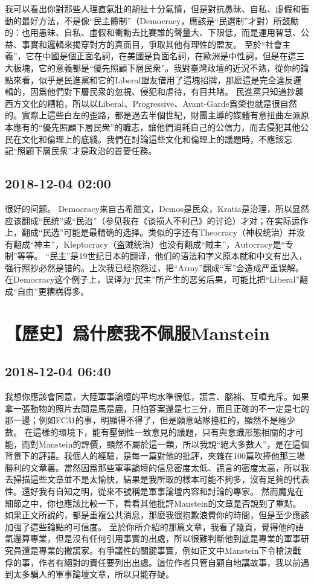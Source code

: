 \documentclass[twocolumn]{ctexart}
\begin{document}
我可以看出你對那些人理直氣壯的胡扯十分氣憤，但是對抗愚昧、自私、虛假和衝動的最好方法，不是像“民主體制”（Democracy，應該是“民選制”才對）所鼓勵的：也用愚昧、自私、虛假和衝動去比賽誰的聲量大、下限低，而是運用智慧、公益、事實和邏輯來揭穿對方的真面目，爭取其他有理性的盟友。
至於“社會主義”，它在中國是個正面名詞，在美國是負面名詞，在歐洲是中性詞，但是在這三大板塊，它的意義都是“優先照顧下層民衆”。我對臺灣政壇的近況不熟，從你的論點來看，似乎是民進黨和它的Liberal盟友借用了這塊招牌，那麽這是完全違反邏輯的，因爲他們對下層民衆的忽視、侵犯和虐待，有目共睹。
民進黨只知道抄襲西方文化的糟粕，所以以Liberal、Progressive、Avant-Garde爲榮也就是很自然的。實際上這些白左的歪路，都是過去半個世紀，財團主導的媒體有意扭曲左派原本應有的“優先照顧下層民衆”的職志，讓他們消耗自己的公信力，而去侵犯其他公民在文化和倫理上的底綫。我們在討論這些文化和倫理上的議題時，不應該忘記“照顧下層民衆”才是政治的首要任務。
\subsection*{2018-12-04 02:00}

很好的问题。 
Democracy来自古希腊文，Demos是民众，Kratia是治理，所以显然应该翻成“民统”或“民治”（参见我在《谈损人不利己》的讨论）才对；在实际运作上，翻成“民选”可能是最精确的选择。类似的字还有Theocracy（神权统治）并没有翻成“神主”，Kleptocracy（盗贼统治）也没有翻成“贼主”，Autocracy是“专制”等等。 
“民主”是19世纪日本的翻译，他们的语法和字义原本就和中文有出入，强行照抄必然是错的。上次我已经抱怨过，把“Army”翻成“军”会造成严重误解。在Democracy这个例子上，误译为“民主”所产生的恶劣后果，可能比把“Liberal”翻成“自由”更糟糕得多。
\section*{【歷史】爲什麽我不佩服Manstein}
\subsection*{2018-12-04 06:40}

我想你應該會同意，大陸軍事論壇的平均水準很低，謊言、腦補、互噴充斥。如果拿一張動物的照片去問是馬是鹿，只怕答案還是七三分，而且正確的不一定是七的那一邊；例如FC31的事，明顯得不得了，但是願意站隊擡杠的，顯然不是極少數。 
在這樣的環境下，能有壓倒性一致意見的議題，只有與意識形態相關的才可能，而對Manstein的評價，顯然不屬於這一類，所以我說“絕大多數人”，是在這個背景下的評語。我個人的經驗，是每一篇對他的批評，夾雜在100篇吹捧他那三場勝利的文章裏。當然因爲那些軍事論壇的信息密度太低、謊言的密度太高，所以我去掃描這些文章並不是太愉快，結果是我所取的樣本可能不夠多，沒有足夠的代表性。還好我有自知之明，從來不號稱是軍事論壇内容和討論的專家。 
然而魔鬼在細節之中，你也應該比較一下，看看其他批評Manstein的文章是否說到了重點。如果正文所說的，都是重複公共消息，那麽我很抱歉浪費你的時間，但是至少應該加强了這些論點的可信度。 
至於你所介紹的那篇文章，我看了幾頁，覺得他的語氣還算專業，但是沒有任何引用事實的出處，所以很難判斷他到底是專業的軍事研究員還是專業的撒謊家。有爭議性的關鍵事實，例如正文中Manstein下令槍決戰俘的事，作者有絕對的責任要列出出處。這位作者只管自顧自地講故事，我以前遇到太多騙人的軍事論壇文章，所以只能存疑。
\end{document}
